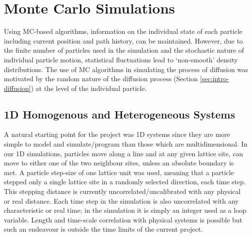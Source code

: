 
\section{Monte Carlo Simulations}
\label{section:mc-sims}

	Using MC-based algorithms, information on the individual state of each particle including current position and path history, can be maintained. However, due to the finite number of particles used in the simulation and the stochastic nature of individual particle motion, statistical fluctuations lead to `non-smooth' density distributions. The use of MC algorithms in simulating the process of diffusion was motivated by the random nature of the diffusion process (Section \ref{sec:intro-diffusion}) at the level of the individual particle.

\subsection{1D Homogenous and Heterogeneous Systems}
\label{section:mc-sims-1D}
	A natural starting point for the project was 1D systems since they are more simple to model and simulate/program than those which are multidimensional. In our 1D simulations, particles move along a line and at any given lattice site, can move to either one of the two neighbour sites, unless an absolute boundary is met. A particle step-size of one lattice unit was used, meaning that a particle stepped only a single lattice site in a randomly selected direction, each time step. This stepping distance is currently uncorrelated/uncalibrated with any physical or real distance. Each time step in the simulation is also uncorrelated with any characteristic or real time; in the simulation it is simply an integer used as a loop variable. Length and time-scale correlation with physical systems is possible but such an endeavour is outside the time limits of the current project.
	
